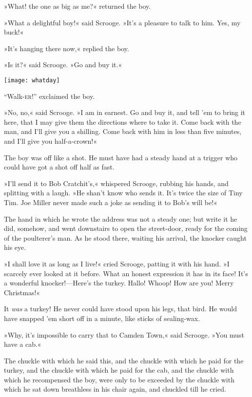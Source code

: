 »What! the one as big as me?« returned the boy.

»What a delightful boy!« said Scrooge. »It's a pleasure to talk to him. Yes, my buck!«

»It's hanging there now,« replied the boy.

»Is it?« said Scrooge. »Go and buy it.«

\begin{center}
\begin{minipage}[c]{\textwidth}
\texttt{[image: whatday]}
\end{minipage}
\end{center}

\enquote{Walk-\textsc{er}!} exclaimed the boy.

»No, no,« said Scrooge. »I am in earnest. Go and buy it, and tell 'em to bring it here, that I may give them the directions where to take it. Come back with the man, and I'll give you a shilling. Come back with him in less than five minutes, and I'll give you half-a-crown!«

The boy was off like a shot. He must have had a steady hand at a trigger who could have got a shot off half as fast.

»I'll send it to Bob Cratchit's,« whispered Scrooge, rubbing his hands, and splitting with a laugh. »He shan't know who sends it. It's twice the size of Tiny Tim. Joe Miller never made such a joke as sending it to Bob's will be!«

The hand in which he wrote the address was not a steady one; but write it he did, somehow, and went downstairs to open the street-door, ready for the coming of the poulterer's man. As he stood there, waiting his arrival, the knocker caught his eye.

»I shall love it as long as I live!« cried Scrooge, patting it with his hand. »I scarcely ever looked at it before. What an honest expression it has in its face! It's a wonderful knocker!—Here's the turkey. Hallo! Whoop! How are you! Merry Christmas!«

It \textit{was} a turkey! He never could have stood upon his legs, that bird. He would have snapped 'em short off in a minute, like sticks of sealing-wax.

»Why, it's impossible to carry that to Camden Town,« said Scrooge. »You must have a cab.«

The chuckle with which he said this, and the chuckle with which he paid for the turkey, and the chuckle with which he paid for the cab, and the chuckle with which he recompensed the boy, were only to be exceeded by the chuckle with which he sat down breathless in his chair again, and chuckled till he cried.

